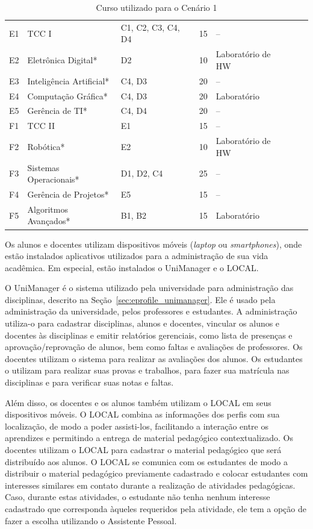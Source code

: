 \begin{table}
\begin{tabular*}{1\textwidth}{@{}lllllll@{}}
    \midrule
    E1 & TCC I                  & C1, C2, C3, C4, D4 & 15 & -- \\
    E2 & Eletrônica Digital*    & D2 & 10 & Laboratório de HW \\
    E3 & Inteligência Artificial* & C4, D3 & 20 & -- \\
    E4 & Computação Gráfica*    & C4, D3 & 20 & Laboratório \\
    E5 & Gerência de TI*        & C4, D4 & 20 & -- \\
    \midrule
    F1 & TCC II                 & E1 & 15 & -- \\
    F2 & Robótica*              & E2 & 10 & Laboratório de HW \\
    F3 & Sistemas Operacionais* & D1, D2, C4 & 25 & -- \\
    F4 & Gerência de Projetos*  & E5 & 15 & -- \\
    F5 & Algoritmos Avançados*  & B1, B2 & 15 & Laboratório \\
    \bottomrule
  \end{tabular*}
  \caption{Curso utilizado para o Cenário 1}
  \label{tab:curso}
\end{table}

Os alunos e docentes utilizam dispositivos móveis ({\em laptop} ou {\em smartphones}), onde estão instalados aplicativos utilizados para a administração de sua vida acadêmica. Em especial, estão instalados o UniManager e o LOCAL.

O UniManager é o sistema utilizado pela universidade para administração das disciplinas, descrito na Seção~\ref{sec:eprofile_unimanager}. Ele é usado pela administração da universidade, pelos professores e estudantes. A administração utiliza-o para cadastrar disciplinas, alunos e docentes,  vincular os alunos e docentes às disciplinas e emitir relatórios gerenciais, como lista de presenças e aprovação/reprovação de alunos, bem como faltas e avaliações de professores. Os docentes utilizam o sistema para realizar as avaliações dos alunos. Os estudantes o utilizam para realizar suas provas e trabalhos, para fazer sua matrícula nas disciplinas e para verificar suas notas e faltas.

Além disso, os docentes e os alunos também utilizam o LOCAL em seus dispositivos móveis. O LOCAL combina as informações dos perfis com sua localização, de modo a poder assisti-los, facilitando a interação entre os aprendizes e permitindo a entrega de material pedagógico contextualizado. Os docentes utilizam o LOCAL para cadastrar o material pedagógico que será distribuído aos alunos. O LOCAL se comunica com os estudantes de modo a distribuir o material pedagógico previamente cadastrado e colocar estudantes com interesses similares em contato durante a realização de atividades pedagógicas. Caso, durante estas atividades, o estudante não tenha nenhum interesse cadastrado que corresponda àqueles requeridos pela atividade, ele tem a opção de fazer a escolha utilizando o Assistente Pessoal. 


